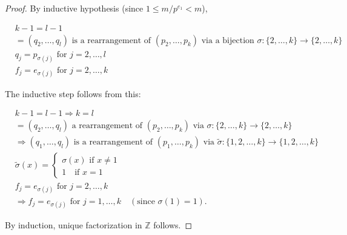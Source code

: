 \documentclass[11pt]{article}
\begin{document}
\begin{proof}
    By inductive hypothesis (since \(1 \leq m / p^{e_1} < m\)),

    \[
        \begin{aligned}
             & k - 1 = l - 1                                                                                                                                         \\
             & = (q_2, \ldots, q_l) \text{ is a rearrangement of } (p_2, \ldots, p_k) \text{ via a bijection } \sigma: \{2, \ldots, k\} \rightarrow \{2, \ldots, k\} \\
             & q_j = p_{\sigma(j)} \text{ for } j = 2, \ldots, l                                                                                                     \\
             & f_j = e_{\sigma(j)} \text{ for } j = 2, \ldots, k
        \end{aligned}
    \]

    The inductive step follows from this:

    \[
        \begin{aligned}
             & k - 1 = l - 1 \Rightarrow k = l                                                                                                                                   \\
             & = (q_2, \ldots, q_l) \text{ a rearrangement of } (p_2, \ldots, p_k) \text{ via } \sigma: \{2, \ldots, k\} \rightarrow \{2, \ldots, k\}                            \\
             & \Rightarrow (q_1, \ldots, q_l) \text{ is a rearrangement of } (p_1, \ldots, p_k) \text{ via } \tilde{\sigma}: \{1, 2, \ldots, k\} \rightarrow \{1, 2, \ldots, k\} \\
             & \tilde{\sigma}(x) =
            \begin{cases}
                \sigma(x) \text{ if } x \neq 1 \\
                1 \quad \text{if } x = 1
            \end{cases}                                                                                                                                       \\
             & f_j = e_{\sigma(j)} \text{ for } j = 2, \ldots, k                                                                                                                 \\
             & \Rightarrow f_j = e_{\sigma(j)} \text{ for } j = 1, \ldots, k \quad (\text{since } \sigma(1) = 1).
        \end{aligned}
    \]

    By induction, unique factorization in \(\mathbb{Z}\) follows.
\end{proof}
\end{document}
